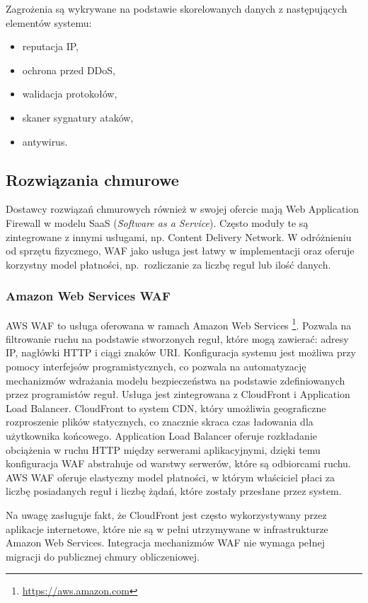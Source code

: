 \documentclass[11pt,a4paper,polish,thesis,oneside]{dcsbook}
\begin{document}
Zagrożenia są wykrywane na podstawie skorelowanych danych z następujących elementów systemu:
\begin{itemize}
\item reputacja IP,
\item ochrona przed DDoS,
\item walidacja protokołów,
\item skaner sygnatury ataków,
\item antywirus.
\end{itemize}

\subsection{Rozwiązania chmurowe}
Dostawcy rozwiązań chmurowych również w swojej ofercie mają Web Application Firewall w modelu SaaS (\textit{Software as a Service}). Często moduły te są zintegrowane z innymi usługami, np. Content Delivery Network. W odróżnieniu od sprzętu fizycznego, WAF jako usługa jest łatwy w implementacji oraz oferuje korzystny model płatności, np.~rozliczanie za liczbę reguł lub ilość danych.
\subsubsection{Amazon Web Services WAF}
AWS WAF to usługa oferowana w ramach Amazon Web Services \footnote{\url{https://aws.amazon.com}}. Pozwala na filtrowanie ruchu na podstawie stworzonych reguł, które mogą zawierać: adresy IP, nagłówki HTTP i ciągi znaków URI. Konfiguracja systemu jest możliwa przy pomocy interfejsów programistycznych, co pozwala na automatyzację mechanizmów wdrażania modelu bezpieczeństwa na podstawie zdefiniowanych przez programistów reguł. Usługa jest zintegrowana z CloudFront i Application Load Balancer. CloudFront to system CDN, który umożliwia geograficzne rozproszenie plików statycznych, co znacznie skraca czas ładowania dla użytkownika końcowego. Application Load Balancer oferuje rozkładanie obciążenia w ruchu HTTP między serwerami aplikacyjnymi, dzięki temu konfiguracja WAF abstrahuje od warstwy serwerów, które są odbiorcami ruchu. AWS WAF oferuje elastyczny model płatności, w którym właściciel płaci za liczbę posiadanych reguł i liczbę żądań, które zostały przesłane przez system.

Na uwagę zasługuje fakt, że CloudFront jest często wykorzystywany przez aplikacje internetowe, które nie są w pełni utrzymywane w infrastrukturze Amazon Web Services. Integracja mechanizmów WAF nie wymaga pełnej migracji do publicznej chmury obliczeniowej.
\end{document}
